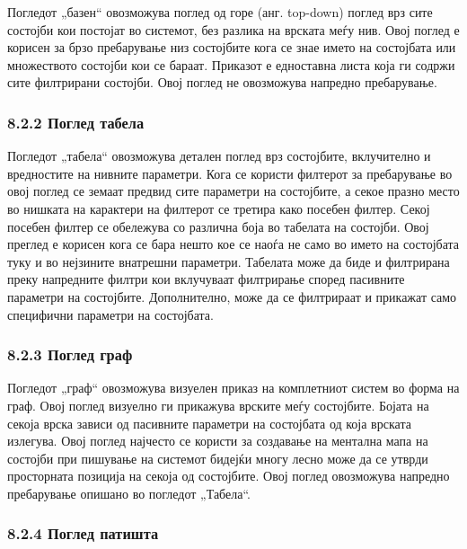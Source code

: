 Погледот „базен“ овозможува поглед од горе (анг. top-down) поглед врз сите состојби кои постојат во системот, без разлика на врската меѓу нив. Овој поглед е корисен за брзо пребарување низ состојбите кога се знае името на состојбата или множеството состојби кои се бараат. Приказот е едноставна листа која ги содржи сите филтрирани состојби. Овој поглед не овозможува напредно пребарување.


\subsubsection{8.2.2 Поглед табела}

Погледот „табела“ овозможува детален поглед врз состојбите, вклучително и вредностите на нивните параметри. Кога се користи филтерот за пребарување во овој поглед се земаат предвид сите параметри на состојбите, а секое празно место во нишката на карактери на филтерот се третира како посебен филтер. Секој посебен филтер се обележува со различна боја во табелата на состојби. Овој преглед е корисен кога се бара нешто кое се наоѓа не само во името на состојбата туку и во нејзините внатрешни параметри. Табелата може да биде и филтрирана преку напредните филтри кои вклучуваат филтрирање според пасивните параметри на состојбите. Дополнително, може да се филтрираат и прикажат само специфични параметри на состојбата.


\subsubsection{8.2.3 Поглед граф}

Погледот „граф“ овозможува визуелен приказ на комплетниот систем во форма на граф. Овој поглед визуелно ги прикажува врските меѓу состојбите. Бојата на секоја врска зависи од пасивните параметри на состојбата од која врската излегува. Овој поглед најчесто се користи за создавање на ментална мапа на состојби при пишување на системот бидејќи многу лесно може да се утврди просторната позиција на секоја од состојбите. Овој поглед овозможува напредно пребарување опишано во погледот „Табела“.


\subsubsection{8.2.4 Поглед патишта}

